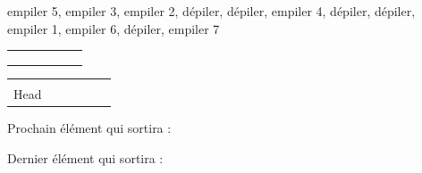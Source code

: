 \documentclass[11pt,a4paper]{article}
\begin{document}
\begin{center}

\begin{large}
empiler 5, empiler 3, empiler 2, dépiler, dépiler, empiler 4, dépiler, dépiler, empiler 1, \linebreak empiler 6, dépiler, empiler 7
\end{large}

\bigskip

\begin{tabular}{ | C{1cm} | C{1cm} | C{1cm} | C{1cm} | C{1cm} | C{1cm} | }
  \hline
     &    &    &    &    &    \\
     &    &    &    &    &    \\
     &    &    &    &    &    \\
  \hline
\end{tabular}

\smallskip

\begin{tabular}{   C{1cm}   C{1cm}   C{1cm}   C{1cm}   C{1cm}   C{1cm}   }
   &  &  &  &  &  \\
  Head &  &  &  &  &  \\
\end{tabular}


\begin{table}[ht!]
  \begin{minipage}{0.50\textwidth}

Prochain élément qui sortira :

  \end{minipage}
  \hfillx
  \begin{minipage}{0.50\textwidth}

Dernier élément qui sortira :

  \end{minipage}
\end{table}
\end{center}


\bigskip
\end{document}

